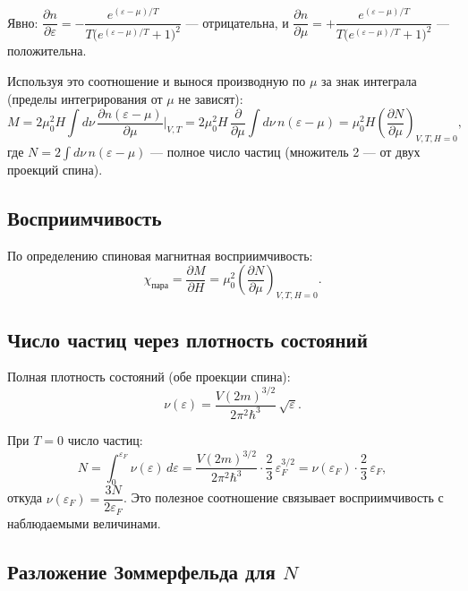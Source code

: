 \documentclass[12pt,a4paper]{article}
\begin{document}
Явно: $\dfrac{\partial n}{\partial \varepsilon} = -\dfrac{e^{(\varepsilon-\mu)/T}}{T\bigl(e^{(\varepsilon-\mu)/T}+1\bigr)^2}$ — отрицательна, и $\dfrac{\partial n}{\partial \mu} = +\dfrac{e^{(\varepsilon-\mu)/T}}{T\bigl(e^{(\varepsilon-\mu)/T}+1\bigr)^2}$ — положительна.

Используя это соотношение и вынося производную по $\mu$ за знак интеграла (пределы интегрирования от $\mu$ не зависят):
\begin{equation}
    M = 2\mu_0^2 H \int d\nu\, \frac{\partial n(\varepsilon-\mu)}{\partial \mu}\bigg|_{V,T}
      = 2\mu_0^2 H \,\frac{\partial}{\partial \mu} \int d\nu\, n(\varepsilon-\mu)
      = \mu_0^2 H \left(\frac{\partial N}{\partial \mu}\right)_{V,T,H=0},
\end{equation}
где $N = 2\int d\nu\, n(\varepsilon - \mu)$ — полное число частиц (множитель 2 — от двух проекций спина).

\subsection*{Восприимчивость}

По определению спиновая магнитная восприимчивость:
\begin{equation}
    \chi_\text{пара} = \frac{\partial M}{\partial H} = \mu_0^2 \left(\frac{\partial N}{\partial \mu}\right)_{V,T,H=0}.
\end{equation}

\subsection*{Число частиц через плотность состояний}

Полная плотность состояний (обе проекции спина):
\begin{equation}
    \nu(\varepsilon) = \frac{V(2m)^{3/2}}{2\pi^2\hbar^3}\,\sqrt{\varepsilon}.
\end{equation}

При $T = 0$ число частиц:
\begin{equation}
    N = \int_0^{\varepsilon_F} \nu(\varepsilon)\, d\varepsilon
      = \frac{V(2m)^{3/2}}{2\pi^2\hbar^3} \cdot \frac{2}{3}\,\varepsilon_F^{3/2}
      = \nu(\varepsilon_F) \cdot \frac{2}{3}\,\varepsilon_F,
\end{equation}
откуда $\nu(\varepsilon_F) = \dfrac{3N}{2\varepsilon_F}$. Это полезное соотношение связывает восприимчивость с наблюдаемыми величинами.

\subsection*{Разложение Зоммерфельда для $N$}
\end{document}
